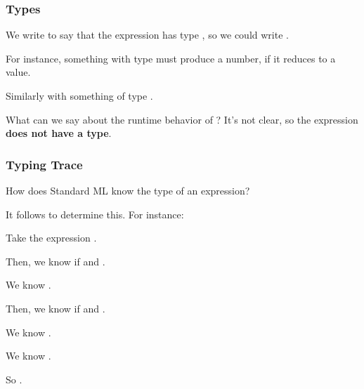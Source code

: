 \documentclass[aspectratio=169, handout]{beamer}
\begin{document}
\begin{frame}[fragile]
  \frametitle{Types}


  \pause
  \vspace{5pt}

  We write  to say that the expression  has type , so
  we could write .

  \pause
  \vspace{\fill}

  For instance, something with type  must produce a number, if it reduces to a value.

  \vspace{5pt}

  Similarly with something of type .

  \pause
  \vspace{\fill}

  What can we say about the runtime behavior of ? It's not clear, so
  the expression  \textbf{does not have a type}.
\end{frame}

\begin{frame}[fragile]
  \frametitle{Typing Trace}

  How does Standard ML know the type of an expression?

  \vspace{5pt}

  It follows  to determine this. For instance:

  \pause
  \vspace{\fill}


  \pause
  \vspace{\fill}

  Take the expression .

  \pause
  \vspace{\fill}

  Then, we know  if  and .
  \pause
  \vspace{3pt}

  We know .
  \pause
  \vspace{3pt}

  Then, we know  if  and .
  \pause
  \vspace{3pt}

  We know .
  \pause
  \vspace{3pt}

  We know .
  \pause
  \vspace{3pt}

  So .
\end{frame}
\end{document}
